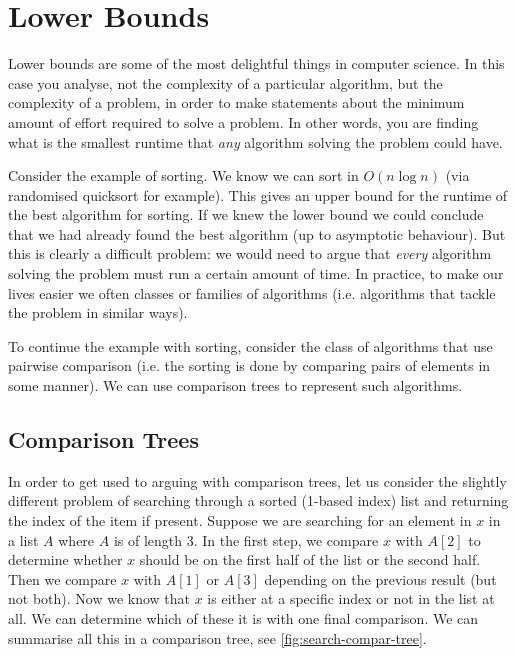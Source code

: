 \section{Lower Bounds}
Lower bounds are some of the most delightful things in computer science. In this case you analyse, not the complexity of a particular algorithm, but the complexity of a problem, in order to make statements about the minimum amount of effort required to solve a problem. In other words, you are finding what is the smallest runtime that \textit{any} algorithm solving the problem could have. 

Consider the example of sorting. We know we can sort in $O(n \log n)$ (via randomised quicksort for example). This gives an upper bound for the runtime of the best algorithm for sorting. If we knew the lower bound we could conclude that we had already found the best algorithm (up to asymptotic behaviour). But this is clearly a difficult problem: we would need to argue that \textit{every} algorithm solving the problem must run a certain amount of time. In practice, to make our lives easier we often classes or families of algorithms (i.e. algorithms that tackle the problem in similar ways). 

To continue the example with sorting, consider the class of algorithms that use pairwise comparison (i.e. the sorting is done by comparing pairs of elements in some manner). We can use comparison trees to represent such algorithms. 

\subsection{Comparison Trees}
In order to get used to arguing with comparison trees, let us consider the slightly different problem of searching through a sorted (1-based index) list and returning the index of the item if present. Suppose we are searching for an element in $x$ in a list $A$ where $A$ is of length 3. In the first step, we compare $x$ with $A[2]$ to determine whether $x$ should be on the first half of the list or the second half. Then we compare $x$ with $A[1]$ or $A[3]$ depending on the previous result (but not both). Now we know that $x$ is either at a specific index or not in the list at all. We can determine which of these it is with one final comparison. We can summarise all this in a comparison tree, see \autoref{fig:search-compar-tree}.

